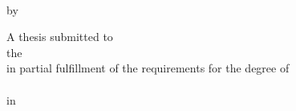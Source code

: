 \begin{titlepage}
\centering
\thispagestyle{empty}


\vspace*{0.5cm}
{\large \MakeUppercase{\thesisuniversity}}\\[0.3cm]
{\large \thesisschool}

\vspace{2.5cm}
{\LARGE\bfseries \thesistitle\par}

\vspace{2.5cm}
{\large by}\\[0.6cm]
{\large \thesisauthor}

\vspace*{\fill}

{\large
A thesis submitted to\\
the \thesisschool\\
in partial fulfillment of the requirements for the degree of\\[0.4cm]
\textbf{\thesisdegree}\\
in\\
\textbf{\thesisprogram}\par}

\vspace{2cm}
{\large \thesisuniversity}\\[0.2cm]
{\large \thesismonth\ \thesisyear}

\end{titlepage}
